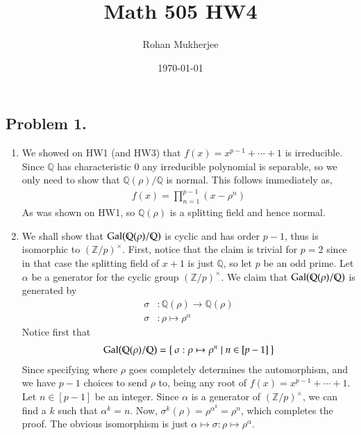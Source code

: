 \documentclass[12pt]{article}
\title{Math 505 HW4}
\date{\today}
\author{Rohan Mukherjee}
\theoremstyle{definitionstyle}
\def\mbb#1{\mathbb{#1}}
\newcommand{\Z}{\mbb Z}
\newcommand{\Q}{\mbb Q}
\newcommand{\Gal}{\mathrm{Gal}\qty}
\begin{document}
	\maketitle
		\subsection*{Problem 1.}
		
		\begin{enumerate}[label=(\arabic*)]
			\item We showed on HW1 (and HW3) that $f(x) = x^{p-1} + \cdots + 1$ is irreducible. Since $\Q$ has characteristic 0 any irreducible polynomial is separable, so we only need to show that $\Q(\rho) / \Q$ is normal. This follows immediately as,
			\begin{align*}
				f(x) = \prod_{n=1}^{p-1} (x-\rho^n)
			\end{align*}
			As was shown on HW1, so $\Q(\rho)$ is a splitting field and hence normal.
			
			\item We shall show that $\Gal(\Q(\rho)/\Q)$ is cyclic and has order $p-1$, thus is isomorphic to $(\Z/p)^\times$. First, notice that the claim is trivial for $p = 2$ since in that case the splitting field of $x+1$ is just $\Q$, so let $p$ be an odd prime. Let $\alpha$ be a generator for the cyclic group $(\Z/p)^\times$. We claim that $\Gal(\Q(\rho)/\Q)$ is generated by
			\begin{align*}
				\sigma&: \Q(\rho) \to \Q(\rho) \\
				\sigma&: \rho \mapsto \rho^\alpha
			\end{align*}
			Notice first that
			\begin{align*}
				\Gal(\Q(\rho)/\Q) = \Set{\sigma: \rho \mapsto \rho^n \mid n \in [p-1]}
			\end{align*}
			Since specifying where $\rho$ goes completely determines the automorphism, and we have $p-1$ choices to send $\rho$ to, being any root of $f(x) = x^{p-1} + \cdots + 1$. Let $n \in [p-1]$ be an integer. Since $\alpha$ is a generator of $(\Z/p)^\times$, we can find a $k$ such that $\alpha^k = n$. Now, $\sigma^k(\rho) = \rho^{\alpha^k} = \rho^n$, which completes the proof. The obvious isomorphism is just $\alpha \mapsto \sigma: \rho \mapsto \rho^\alpha$.
		\end{enumerate}
	
\end{document}

